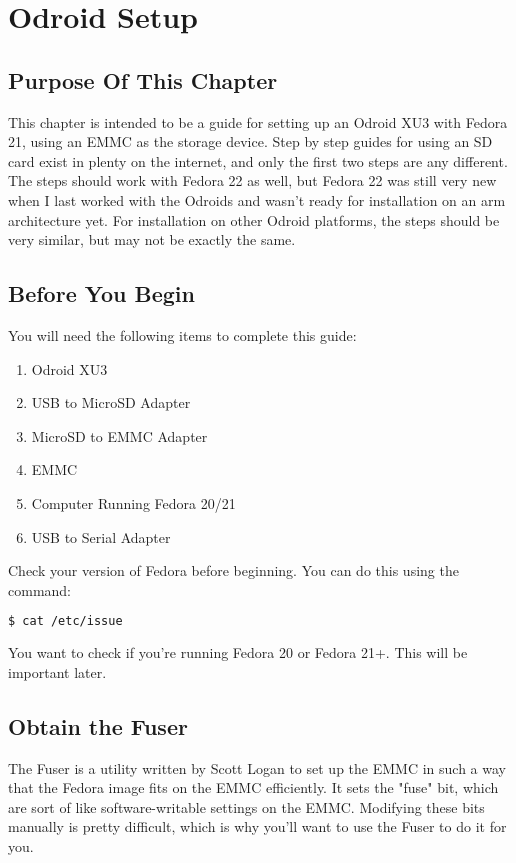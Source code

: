 
\chapter{Odroid Setup}
\label{chap:odroidsetup}

\section{Purpose Of This Chapter}

This chapter is intended to be a guide for setting up an Odroid XU3 with Fedora 21, using an EMMC as the storage device. Step by step guides for using an SD card exist in plenty on the internet, and only the first two steps are any different. The steps should work with Fedora 22 as well, but Fedora 22 was still very new when I last worked with the Odroids and wasn't ready for installation on an arm architecture yet. For installation on other Odroid platforms, the steps should be very similar, but may not be exactly the same.

\section{Before You Begin}

You will need the following items to complete this guide:
\begin{enumerate}
\item{Odroid XU3}
\item{USB to MicroSD Adapter}
\item{MicroSD to EMMC Adapter}
\item{EMMC}
\item{Computer Running Fedora 20/21}
\item{USB to Serial Adapter}
\end{enumerate}

Check your version of Fedora before beginning. You can do this using the command:
\begin{lstlisting}[language=bash]
  $ cat /etc/issue
\end{lstlisting}

You want to check if you're running Fedora 20 or Fedora 21+. This will be important later.

\section{Obtain the Fuser}

The Fuser is a utility written by Scott Logan to set up the EMMC in such a way that the Fedora image fits on the EMMC efficiently. It sets the "fuse" bit, which are sort of like software-writable settings on the EMMC. Modifying these bits manually is pretty difficult, which is why you'll want to use the Fuser to do it for you.

